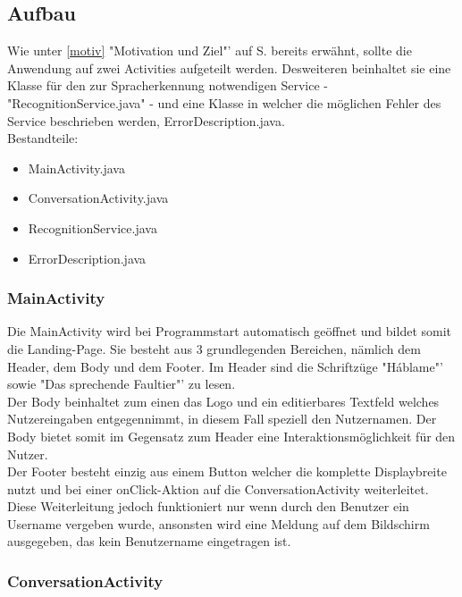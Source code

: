 	\subsection{Aufbau}\label{aufbau}

	Wie unter \ref{motiv} "Motivation und Ziel"' auf S.\pageref{motiv} bereits erwähnt, sollte die Anwendung auf zwei Activities aufgeteilt werden. Desweiteren beinhaltet sie eine Klasse für den zur Spracherkennung notwendigen Service - "RecognitionService.java" - und eine Klasse in welcher die möglichen Fehler des Service beschrieben werden, ErrorDescription.java. \\
	
	Bestandteile:
	\begin{itemize}\itemsep0pt
		\item MainActivity.java
		\item ConversationActivity.java
		\item RecognitionService.java
		\item ErrorDescription.java
	\end{itemize}
	
		\subsubsection{MainActivity}\label{mainact}
		Die MainActivity wird bei Programmstart automatisch geöffnet und bildet somit die Landing-Page. Sie besteht aus 3 grundlegenden Bereichen, nämlich dem Header, dem Body und dem Footer. Im Header sind die Schriftzüge "Háblame"' sowie "Das sprechende Faultier"' zu lesen.\\
		Der Body beinhaltet zum einen das Logo und ein editierbares Textfeld welches Nutzereingaben entgegennimmt, in diesem Fall speziell den Nutzernamen. Der Body bietet somit im Gegensatz zum Header eine Interaktionsmöglichkeit für den Nutzer.\\
		Der Footer besteht einzig aus einem Button welcher die komplette Displaybreite nutzt und bei einer onClick-Aktion auf die ConversationActivity weiterleitet. Diese Weiterleitung jedoch funktioniert nur wenn durch den Benutzer ein Username vergeben wurde, ansonsten wird eine Meldung auf dem Bildschirm ausgegeben, das kein Benutzername eingetragen ist. \\

		\subsubsection{ConversationActivity}\label{convact}
		
